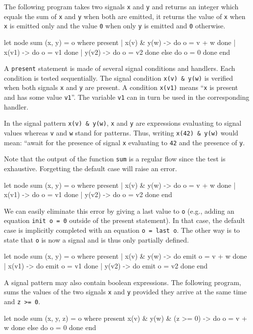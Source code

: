 \documentclass[11pt,titlepage,twoside]{report}
\begin{document}
The following program takes two signals \verb-x- and \verb-y- and
returns an integer which equals the sum of \verb-x- and \verb-y- when
both are emitted, it returns the value of \verb-x- when \verb-x- is
emitted only and the value \verb-0- when only \verb-y- is emitted and
\verb-0- otherwise.
\begin{runverbatim}[withresult]
let node sum (x, y) = o where
  present
  | x(v) & y(w) -> do o = v + w done
  | x(v1) -> do o = v1 done
  | y(v2) -> do o = v2 done
  else do o = 0 done
  end
\end{runverbatim}
A \verb-present- statement is made of several signal conditions and
handlers. Each condition is tested sequentially. The signal condition
\verb-x(v) & y(w)- is verified when both signals \verb-x- and \verb-y-
are present. A condition \verb-x(v1)- means ``\verb-x- is present and
has some value \verb-v1-''. The variable \verb-v1- can in turn be used
in the corresponding handler.

In the signal pattern \verb-x(v) & y(w)-, \verb-x- and \verb-y- are
expressions evaluating to signal values whereas \verb-v- and \verb-w-
stand for patterns. Thus, writing \verb-x(42) & y(w)- would mean:
``await for the presence of signal \verb-x- evaluating to \verb-42-
and the presence of \verb-y-.

Note that the output of the function \verb-sum- is a regular flow
since the test is exhaustive. Forgetting the default case will raise
an error.
\begin{runverbatim}
let node sum (x, y) = o where
  present
  | x(v) & y(w) -> do o = v + w done
  | x(v1) -> do o = v1 done
  | y(v2) -> do o = v2 done
  end
\end{runverbatim}

We can easily eliminate this error by giving a last value to \verb-o-
(e.g., adding an equation \verb-init o = 0- outside of the present
statement). In that case, the default case is implicitly completed
with an equation \verb-o = last o-. The other way is to state that
\verb-o- is now a signal and is thus only partially defined.
\begin{runverbatim}[withresult]
let node sum (x, y) = o where
  present
  | x(v) & y(w) -> do emit o = v + w done
  | x(v1) -> do emit o = v1 done
  | y(v2) -> do emit o = v2 done
  end
\end{runverbatim}

A signal pattern may also contain boolean expressions. The following
program, sums the values of the two signals \verb-x- and \verb-y-
provided they arrive at the same time and \verb-z >= 0-.
\begin{runverbatim}
let node sum (x, y, z) = o where
  present
    x(v) & y(w) & (z >= 0) -> do o = v + w done
  else do o = 0 done
  end
\end{runverbatim}
\end{document}
